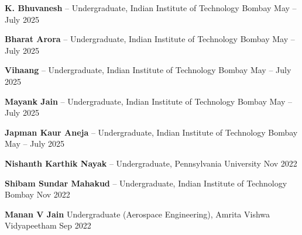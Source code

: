 \textbf{K. Bhuvanesh} -- Undergraduate, Indian Institute of Technology Bombay \hfill May -- July 2025

\vspace{0.5em}

\textbf{Bharat Arora} -- Undergraduate, Indian Institute of Technology Bombay \hfill May -- July 2025

\vspace{0.5em}

\textbf{Vihaang} -- Undergraduate, Indian Institute of Technology Bombay \hfill May -- July 2025

\vspace{0.5em}

\textbf{Mayank Jain} -- Undergraduate, Indian Institute of Technology Bombay \hfill May -- July 2025

\vspace{0.5em}

\textbf{Japman Kaur Aneja} -- Undergraduate, Indian Institute of Technology Bombay \hfill May -- July 2025

\vspace{0.5em}

\textbf{Nishanth Karthik Nayak} --  Undergraduate, Pennsylvania University \hfill Nov 2022

\vspace{0.5em}

\textbf{Shibam Sundar Mahakud} -- Undergraduate, Indian Institute of Technology Bombay \hfill Nov 2022

\vspace{0.5em}

\textbf{Manan V Jain} Undergraduate (Aerospace Engineering), Amrita Vishwa Vidyapeetham \hfill Sep 2022